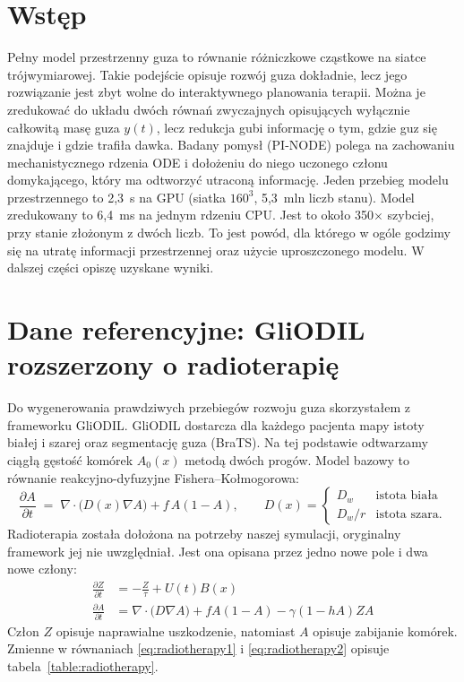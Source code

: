 \documentclass[11pt,a4paper]{article}
\begin{document}
\section{Wstęp}

Pełny model przestrzenny guza to równanie różniczkowe cząstkowe na siatce
trójwymiarowej. Takie podejście opisuje rozwój guza dokładnie, lecz jego rozwiązanie jest zbyt wolne do interaktywnego planowania terapii.
Można je zredukować do układu dwóch równań zwyczajnych opisujących wyłącznie
całkowitą masę guza $y(t)$, lecz redukcja gubi informację o tym,
gdzie guz się znajduje i gdzie trafiła dawka. Badany pomysł (PI-NODE) polega na zachowaniu mechanistycznego rdzenia ODE i dołożeniu
do niego uczonego członu domykającego, który ma odtworzyć utraconą informację. Jeden przebieg modelu przestrzennego to
2,3~s na GPU (siatka $160^3$, 5,3~mln liczb stanu). Model zredukowany to
6,4~ms na jednym rdzeniu CPU. Jest to około 350$\times$ szybciej, przy stanie złożonym z dwóch liczb. To jest powód, dla którego w ogóle godzimy się na utratę informacji przestrzennej oraz użycie uproszczonego modelu. W dalszej części opiszę uzyskane wyniki.

\section{Dane referencyjne: GliODIL rozszerzony o radioterapię}

Do wygenerowania prawdziwych przebiegów rozwoju guza skorzystałem z frameworku GliODIL. GliODIL dostarcza dla każdego pacjenta mapy istoty białej i szarej oraz segmentację
guza (BraTS). Na tej podstawie odtwarzamy ciągłą gęstość komórek $A_0(x)$ metodą
dwóch progów. Model bazowy to równanie reakcyjno-dyfuzyjne Fishera--Kołmogorowa:
\begin{equation}
\frac{\partial A}{\partial t} \;=\; \nabla\!\cdot\!\big(D(x)\nabla A\big) + f\,A(1-A),
\qquad
D(x) = \begin{cases} D_w & \text{istota biała}\\[1mm] D_w/r & \text{istota szara}.\end{cases}
\end{equation}
Radioterapia została dołożona na potrzeby naszej symulacji, oryginalny framework jej nie uwzględniał. Jest ona opisana przez jedno nowe pole i dwa nowe człony:
\begin{align}
\frac{\partial Z}{\partial t} &= -\frac{Z}{\tau} + U(t)B(x) \label{eq:radiotherapy1} \\
\frac{\partial A}{\partial t} &= \nabla\cdot\big(D\nabla A\big) + fA(1-A) - \gamma(1-hA)ZA \label{eq:radiotherapy2}
\end{align}
Człon $Z$ opisuje naprawialne uszkodzenie, natomiast $A$ opisuje zabijanie komórek. Zmienne w równaniach \eqref{eq:radiotherapy1} i \eqref{eq:radiotherapy2} opisuje tabela~\ref{table:radiotherapy}.
\end{document}
